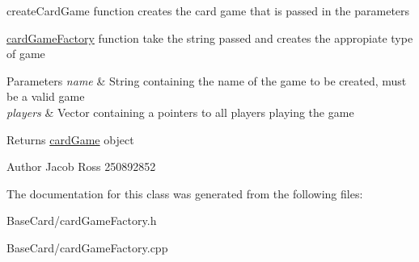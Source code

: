 create\+Card\+Game function creates the card game that is passed in the parameters 

\hyperlink{classcardGameFactory}{card\+Game\+Factory} function take the string passed and creates the appropiate type of game 
\begin{DoxyParams}{Parameters}
{\em name} & String containing the name of the game to be created, must be a valid game \\
\hline
{\em players} & Vector containing a pointers to all players playing the game \\
\hline
\end{DoxyParams}
\begin{DoxyReturn}{Returns}
\hyperlink{classcardGame}{card\+Game} object 
\end{DoxyReturn}
\begin{DoxyAuthor}{Author}
Jacob Ross 250892852 
\end{DoxyAuthor}


The documentation for this class was generated from the following files\+:\begin{DoxyCompactItemize}
\item 
Base\+Card/card\+Game\+Factory.\+h\item 
Base\+Card/card\+Game\+Factory.\+cpp\end{DoxyCompactItemize}
